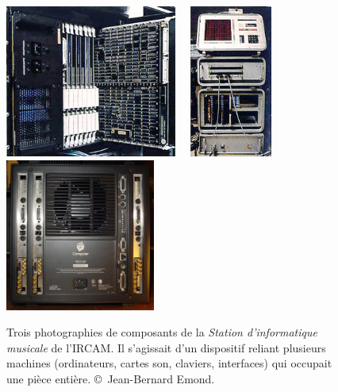 \documentclass[a4paper,12pt]{article}
\begin{document}
\begin{figure}[!h]
\begin{center}
\includegraphics[height=5cm]{images/sim1.jpg}~~
\includegraphics[height=5cm]{images/sim2.jpg}~~
\includegraphics[height=5cm]{images/sim3.jpg}
\caption{\footnotesize Trois photographies de composants de la \emph{Station d'informatique musicale} de l'IRCAM. Il s'agissait d'un dispositif reliant plusieurs machines (ordinateurs, cartes son, claviers, interfaces) qui occupait une pièce entière. \copyright~Jean-Bernard Emond.}
\label{simphoto}
\end{center}
\end{figure}
\end{document}
